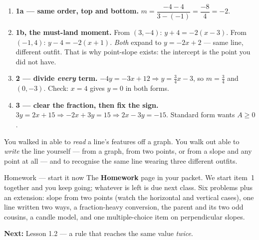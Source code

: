 \documentclass[aspectratio=169, 11pt]{beamer}
\begin{document}
\begin{frame}[t, plain]
  \begin{enumerate}\setlength{\itemsep}{5pt}
    \item \textbf{1a --- same order, top and bottom.}
          $m=\dfrac{-4-4}{3-(-1)}=\dfrac{-8}{4}=-2$.
    \item \textbf{1b, the must-land moment.} From $(3,-4)$: $y+4=-2(x-3)$. From $(-1,4)$:
          $y-4=-2(x+1)$. \emph{Both} expand to $y=-2x+2$ --- same line, different outfit. That is
          why point-slope exists: the intercept is the point you did not have.
    \item \textbf{2 --- divide \emph{every} term.} $-4y=-3x+12 \Rightarrow y=\tfrac34x-3$, so
          $m=\tfrac34$ and $(0,-3)$. Check: $x=4$ gives $y=0$ in both forms.
    \item \textbf{3 --- clear the fraction, then fix the sign.} $3y=2x+15 \Rightarrow -2x+3y=15
          \Rightarrow 2x-3y=-15$. Standard form wants $A \ge 0$.
  \end{enumerate}
\end{frame}

\begin{frame}[t, plain]
  You walked in able to \emph{read} a line's features off a graph. You walk out able to \emph{write}
  the line yourself --- from a graph, from two points, or from a slope and any point at all --- and
  to recognise the same line wearing three different outfits.
  \vspace{5pt}
  \begin{block}{Homework --- start it now}
    The \textbf{Homework} page in your packet. We start item~1 together and you keep going; whatever
    is left is due next class. Six problems plus an extension: slope from two points (watch the
    horizontal and vertical cases), one line written two ways, a fraction-heavy conversion, the
    parent and its two odd cousins, a candle model, and one multiple-choice item on perpendicular
    slopes.
  \end{block}
  \vspace{4pt}
  \textbf{Next:} Lesson 1.2 --- a rule that reaches the same value \emph{twice}.
\end{frame}
\end{document}
